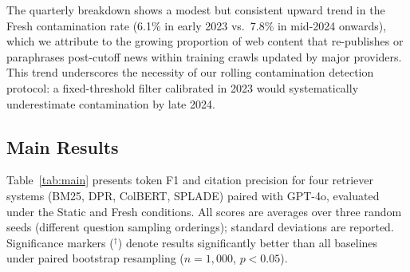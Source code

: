 The quarterly breakdown shows a modest but consistent upward trend in the Fresh contamination rate (6.1\% in early 2023 vs.\ 7.8\% in mid-2024 onwards), which we attribute to the growing proportion of web content that re-publishes or paraphrases post-cutoff news within training crawls updated by major providers. This trend underscores the necessity of our rolling contamination detection protocol: a fixed-threshold filter calibrated in 2023 would systematically underestimate contamination by late 2024.

\subsection{Main Results}

Table~\ref{tab:main} presents token F1 and citation precision for four retriever systems (BM25, DPR, ColBERT, SPLADE) paired with GPT-4o, evaluated under the Static and Fresh conditions. All scores are averages over three random seeds (different question sampling orderings); standard deviations are reported. Significance markers ($^{\dagger}$) denote results significantly better than all baselines under paired bootstrap resampling ($n{=}1{,}000$, $p{<}0.05$).

